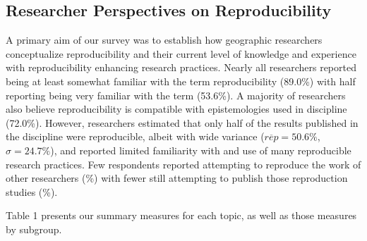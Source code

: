 \documentclass[]{interact}
\theoremstyle{plain}%
\theoremstyle{definition}
\theoremstyle{remark}
\begin{document}
\subsection*{Researcher Perspectives on Reproducibility}
A primary aim of our survey was to establish how geographic researchers conceptualize reproducibility and their current level of knowledge and experience with reproducibility enhancing research practices.
Nearly all researchers reported being at least somewhat familiar with the term reproducibility (89.0\%) with half reporting being very familiar with the term (53.6\%).
A majority of researchers also believe reproducibility is compatible with epistemologies used in discipline (72.0\%). 
However, researchers estimated that only half of the results published in the discipline were reproducible, albeit with wide variance ($\overline{rep}=50.6\%$, $\sigma=24.7\%$), and reported limited familiarity with and use of many reproducible research practices. 
Few respondents reported attempting to reproduce the work of other researchers (\%) with fewer still attempting to publish those reproduction studies (\%). 

Table 1 presents our summary measures for each topic, as well as those measures by subgroup.
\end{document}
